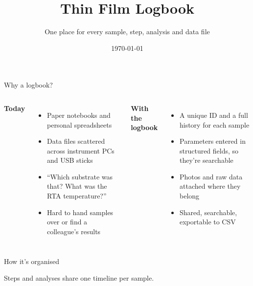 \documentclass[aspectratio=169,11pt]{beamer}
\title{Thin Film Logbook}
\subtitle{One place for every sample, step, analysis and data file}
\date{\today}
\institute{CTN}
\begin{document}
\maketitle

\begin{frame}{Why a logbook?}
  \small
  \begin{columns}[T]
    \textbf{Today}
    \begin{itemize}
      \item Paper notebooks and personal spreadsheets
      \item Data files scattered across instrument PCs and USB sticks
      \item ``Which substrate was that? What was the RTA temperature?''
      \item Hard to hand samples over or find a colleague's results
    \end{itemize}
    \textbf{With the logbook}
    \begin{itemize}
      \item A unique ID and a full history for each sample
      \item Parameters entered in structured fields, so they're searchable
      \item Photos and raw data attached where they belong
      \item Shared, searchable, exportable to CSV
    \end{itemize}
  \end{columns}
\end{frame}

\begin{frame}{How it's organised}
  \centering

  \vspace{0.4cm}
  \small Steps and analyses share one \alert{timeline} per sample.
\end{frame}
\end{document}
